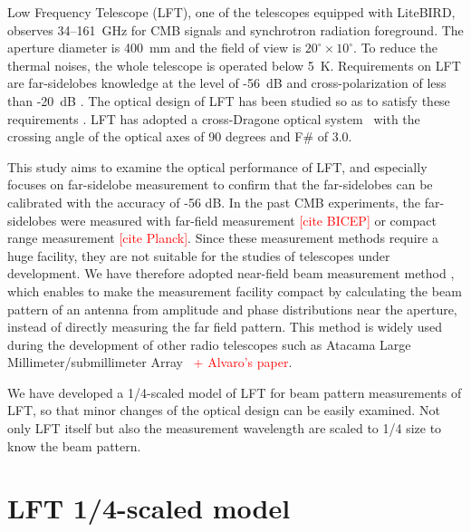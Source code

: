 \documentclass[journal]{IEEEtran}
\newcommand{\red}[1]{\textcolor{red}{#1}}
\begin{document}
\par
Low Frequency Telescope (LFT), one of the telescopes equipped with LiteBIRD, observes 34--161~GHz for CMB signals and synchrotron radiation foreground. The aperture diameter is 400~mm and the field of view is $20^\circ \times 10^\circ$. To reduce the thermal noises, the whole telescope is operated below 5~K.
Requirements on LFT are far-sidelobes knowledge at the level of -56~dB
and cross-polarization of less than -20~dB \cite{Sekimoto2018}. The optical design of LFT has been studied so as to satisfy these requirements \cite{Kashima2018,Imada2018}.
LFT has adopted a cross-Dragone optical system~\cite{Dragone1978} with the crossing angle of the optical axes of 90 degrees and F\# of 3.0.
\par
This study aims to examine the optical performance of LFT, and especially focuses on far-sidelobe measurement to confirm that the far-sidelobes can be calibrated with the accuracy of -56 dB. In the past CMB experiments, the far-sidelobes were measured with far-field measurement \red{[cite BICEP]} or compact range measurement \red{[cite Planck]}. Since these measurement methods require a huge facility, they are not suitable for the studies of telescopes under development. We have therefore adopted near-field beam measurement method \cite{Yaghjian1984}, which enables to make the measurement facility compact by calculating the beam pattern of an antenna from amplitude and phase distributions near the aperture, instead of directly measuring the far field pattern. This method is widely used during the development of other radio telescopes such as Atacama Large Millimeter/submillimeter Array~\cite{Naruse2009} \red{+ Alvaro's paper}. 
\par
We have developed a 1/4-scaled model of LFT for beam pattern measurements of LFT, so that minor changes of the optical design can be easily examined. Not only LFT itself but also the measurement wavelength are scaled to 1/4 size to know the beam pattern.
%
%
\section{LFT 1/4-scaled model}
%
\end{document}
